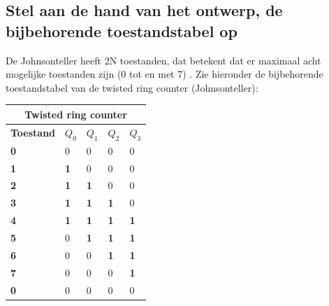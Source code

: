 \documentclass[12pt]{article}
\begin{document}
\subsection{Stel aan de hand van het ontwerp, de bijbehorende toestandstabel op}
\label{lol2}
De Johnsonteller heeft 2N toestanden, dat betekent dat er maximaal acht mogelijke toestanden zijn (0 tot en met 7) \cite{1lol}. 
Zie hieronder de bijbehorende toestandstabel van de twisted ring counter (Johnsonteller):
\begin{table}[h]
    \centering
    \begin{tabular}{|lllll|}
    \hline
    \multicolumn{5}{|c|}{\textbf{Twisted ring counter}}                                                                                                 \\ \hline
    \multicolumn{1}{|l|}{\textbf{Toestand}} & \multicolumn{1}{l|}{\textbf{$Q_{0}$}} & \multicolumn{1}{l|}{\textbf{$Q_{1}$}} & \multicolumn{1}{l|}{\textbf{$Q_{2}$}} & \textbf{$Q_{3}$} \\ \hline
    \multicolumn{1}{|l|}{\textbf{0}} & \multicolumn{1}{l|}{0}          & \multicolumn{1}{l|}{0}          & \multicolumn{1}{l|}{0}          & 0          \\ \hline
    \multicolumn{1}{|l|}{\textbf{1}} & \multicolumn{1}{l|}{\textbf{1}} & \multicolumn{1}{l|}{0}          & \multicolumn{1}{l|}{0}          & 0          \\ \hline
    \multicolumn{1}{|l|}{\textbf{2}} & \multicolumn{1}{l|}{\textbf{1}} & \multicolumn{1}{l|}{\textbf{1}} & \multicolumn{1}{l|}{0}          & 0          \\ \hline
    \multicolumn{1}{|l|}{\textbf{3}} & \multicolumn{1}{l|}{\textbf{1}} & \multicolumn{1}{l|}{\textbf{1}} & \multicolumn{1}{l|}{\textbf{1}} & 0          \\ \hline
    \multicolumn{1}{|l|}{\textbf{4}}        & \multicolumn{1}{l|}{\textbf{1}}  & \multicolumn{1}{l|}{\textbf{1}}  & \multicolumn{1}{l|}{\textbf{1}}  & \textbf{1}  \\ \hline
    \multicolumn{1}{|l|}{\textbf{5}} & \multicolumn{1}{l|}{0}          & \multicolumn{1}{l|}{\textbf{1}} & \multicolumn{1}{l|}{\textbf{1}} & \textbf{1} \\ \hline
    \multicolumn{1}{|l|}{\textbf{6}} & \multicolumn{1}{l|}{0}          & \multicolumn{1}{l|}{0}          & \multicolumn{1}{l|}{\textbf{1}} & \textbf{1} \\ \hline
    \multicolumn{1}{|l|}{\textbf{7}} & \multicolumn{1}{l|}{0}          & \multicolumn{1}{l|}{0}          & \multicolumn{1}{l|}{0}          & \textbf{1} \\ \hline
    \multicolumn{1}{|l|}{\textbf{0}} & \multicolumn{1}{l|}{0}          & \multicolumn{1}{l|}{0}          & \multicolumn{1}{l|}{0}          & 0          \\ \hline
    \end{tabular}
    \end{table}
\pagebreak
\end{document}
